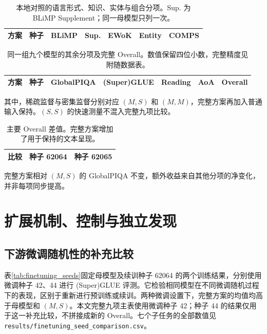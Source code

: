 \begin{table}[htbp]
\caption{本地对照的语言形式、知识、实体与组合分项。Sup. 为 BLiMP Supplement；同一母模型只列一次。}
\label{tab:local_a}
\scriptsize\setlength{\tabcolsep}{3pt}
\begin{tabularx}{\linewidth}{@{}Yrrrrrr@{}}
\toprule 方案 & 种子 & BLiMP & Sup. & EWoK & Entity & COMPS\\\midrule

\end{tabularx}
\end{table}

\begin{table}[htbp]
\caption{同一组九个模型的其余分项及完整 Overall。数值保留四位小数，完整精度见附随数据表。}
\label{tab:local_b}
\scriptsize\setlength{\tabcolsep}{3pt}
\begin{tabularx}{\linewidth}{@{}Yrrrrrr@{}}
\toprule 方案 & 种子 & GlobalPIQA & (Super)GLUE & Reading & AoA & Overall\\\midrule

\end{tabularx}
\end{table}

其中，稀疏监督与密集监督分别对应 $(M,S)$ 和 $(M,M)$，完整方案再加入普通输入保持。$(S,S)$ 的快速测量不混入完整九项比较。

\begin{table}[htbp]
\caption{主要 Overall 差值。完整方案增加了用于保持的文本呈现。}
\begin{tabularx}{\linewidth}{@{}Yrr@{}}
\toprule 比较 & 种子 62064 & 种子 62065\\\midrule

\end{tabularx}
\end{table}

完整方案相对 $(M,S)$ 的 GlobalPIQA 不变，额外收益来自其他分项的净变化，并非每项同步提高。

\FloatBarrier\clearpage
\section{扩展机制、控制与独立发现}
\label{app:extended}

\subsection{下游微调随机性的补充比较}

表\ref{tab:finetuning_seeds}固定母模型及续训种子 62064 的两个训练结果，分别使用微调种子 42、44 进行 \mbox{(Super)GLUE} 评测。它检验相同模型在不同微调随机过程下的表现，区别于重新进行预训练或续训。两种微调设置下，完整方案的均值均高于母模型和 $(M,S)$。本文完整九项主表使用微调种子 42；种子 44 的结果仅用于这一补充比较，不拼接成新的 Overall。七个子任务的全部数值见 \nolinkurl{results/finetuning_seed_comparison.csv}。

